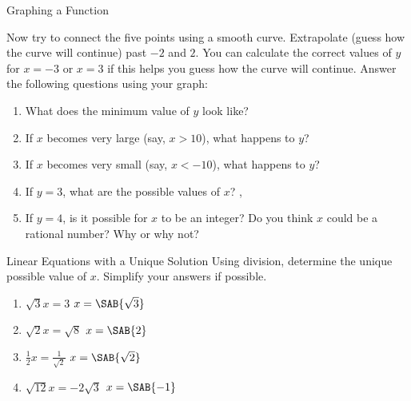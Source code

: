 \documentclass[12pt,letterpaper]{article}
\begin{document}
\begin{problem}{Graphing a Function}
\begin{center}
  \end{center}

  Now try to connect the five points using a smooth curve. Extrapolate (guess how the curve
  will continue) past $-2$ and $2$. You can calculate the correct values of $y$ for $x=-3$
  or $x=3$ if this helps you guess how the curve will continue. Answer the following
  questions using your graph:

  \begin{enumerate}
    \item What does the minimum value of $y$ look like? 
    \item If $x$ becomes very large (say, $x > 10$), what happens to $y$? 
    \item If $x$ becomes very small (say, $x < -10$), what happens to $y$? 
    \item If $y = 3$, what are the possible values of $x$? , 
    \item If $y = 4$, is it possible for $x$ to be an integer? Do you think $x$ could be a
    rational number? Why or why not? 
  \end{enumerate}
\end{problem}

\begin{problem}{Linear Equations with a Unique Solution}
  Using division, determine the unique possible value of \(x\). Simplify your answers if
  possible.

  \begin{multicols}{2}
  \begin{enumerate}[\hspace{.5cm}a.]
    \item \( \sqrt{3}x = 3 \)           \hfill \(x = \SAB{\sqrt{3}}\)
    \item \( \sqrt{2}x = \sqrt{8} \)    \hfill \(x = \SAB{2}\)
    \item \( \displaystyle \frac{1}{2}x = \frac{1}{\sqrt{2}} \)
    \hfill \(x = \SAB{\sqrt{2}}\)
    \item \( \sqrt{12}x = -2\sqrt{3} \) \hfill \(x = \SAB{-1}\)
  \end{enumerate}
  \end{multicols}
\end{problem}
\end{document}
